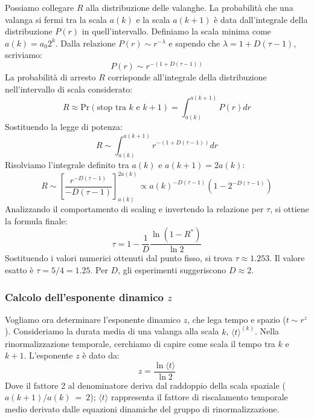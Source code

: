 Possiamo collegare $R$ alla distribuzione delle valanghe. La probabilità che una valanga si fermi tra la scala $a(k)$ e la scala $a(k+1)$ è data dall'integrale della distribuzione $P(r)$ in quell'intervallo.
Definiamo la scala minima come $a(k) = a_0 2^k$.
Dalla relazione $P(r) \sim r^{-\lambda}$ e sapendo che $\lambda = 1 + D(\tau-1)$, scriviamo:
\begin{equation}
    P(r) \sim r^{-(1 + D(\tau - 1))}
\end{equation}
La probabilità di arresto $R$ corrisponde all'integrale della distribuzione nell'intervallo di scala considerato:
\begin{equation}
    R \approx \text{Pr}(\text{stop tra } k \text{ e } k+1) = \int_{a(k)}^{a(k+1)} P(r) dr
\end{equation}
Sostituendo la legge di potenza:
\begin{equation}
    R \sim \int_{a(k)}^{a(k+1)} r^{-(1 + D(\tau - 1))} dr
\end{equation}
Risolviamo l'integrale definito tra $a(k)$ e $a(k+1) = 2a(k)$:
\begin{equation}
    R \sim \left[ \frac{r^{-D(\tau-1)}}{-D(\tau-1)} \right]_{a(k)}^{2a(k)} \propto a(k)^{-D(\tau-1)} (1 - 2^{-D(\tau-1)})
\end{equation}
Analizzando il comportamento di scaling e invertendo la relazione per $\tau$, si ottiene la formula finale:
\begin{equation}
    \tau = 1 - \frac{1}{D} \frac{\ln(1 - R^*)}{\ln 2}
\end{equation}
Sostituendo i valori numerici ottenuti dal punto fisso, si trova $\tau \approx 1.253$.
Il valore esatto è $\tau = 5/4 = 1.25$.
Per $D$, gli esperimenti suggeriscono $D \approx 2$.

\subsubsection{Calcolo dell'esponente dinamico $z$}
Vogliamo ora determinare l'esponente dinamico $z$, che lega tempo e spazio ($t \sim r^z$).
Consideriamo la durata media di una valanga alla scala $k$, $\langle t \rangle^{(k)}$.
Nella rinormalizzazione temporale, cerchiamo di capire come scala il tempo tra $k$ e $k+1$.
L'esponente $z$ è dato da:
\begin{equation}
    z = \frac{\ln \langle t \rangle}{\ln 2}
\end{equation}
Dove il fattore 2 al denominatore deriva dal raddoppio della scala spaziale ($a(k+1)/a(k)~=~2$); $\langle t \rangle$ rappresenta il fattore di riscalamento temporale medio derivato dalle equazioni dinamiche del gruppo di rinormalizzazione.

